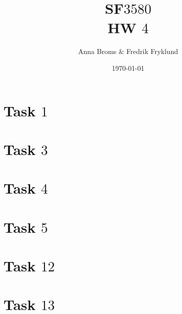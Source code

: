 \documentclass[a4paper]{article}
\title{SF$3580$\\HW $4$}
\author{Anna Broms \& Fredrik Fryklund}
\date{\today}
\begin{document}
\maketitle

 \section*{Task $1$}
 

  \section*{Task $3$}
  
 \section*{Task $4$}
 
 \section*{Task $5$}
 
\section*{Task $12$}

\section*{Task $13$}

\end{document}
